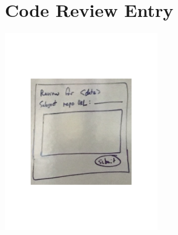 \section*{Code Review Entry}
\begin{center}
\includegraphics[width=0.5\textwidth]{./mocks/code_entry.pdf}
\end{center}
